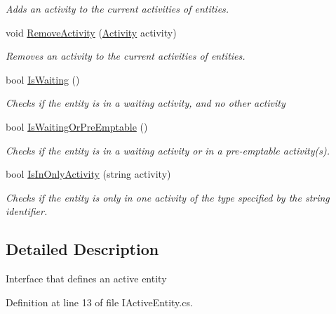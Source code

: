 \begin{DoxyCompactItemize}
\begin{DoxyCompactList}\small\item\em Adds an activity to the current activities of entities. \end{DoxyCompactList}\item 
void \hyperlink{interface_simulation_core_1_1_h_c_c_m_elements_1_1_i_active_entity_a66fe7387a0130d776a02af77973b69e8}{Remove\+Activity} (\hyperlink{class_simulation_core_1_1_h_c_c_m_elements_1_1_activity}{Activity} activity)
\begin{DoxyCompactList}\small\item\em Removes an activity to the current activities of entities. \end{DoxyCompactList}\item 
bool \hyperlink{interface_simulation_core_1_1_h_c_c_m_elements_1_1_i_active_entity_a290d158994bc0c9a1b2bed6969b07a3f}{Is\+Waiting} ()
\begin{DoxyCompactList}\small\item\em Checks if the entity is in a waiting activity, and no other activity \end{DoxyCompactList}\item 
bool \hyperlink{interface_simulation_core_1_1_h_c_c_m_elements_1_1_i_active_entity_a3429416bd86ca81cb6e272ba535aa8ea}{Is\+Waiting\+Or\+Pre\+Emptable} ()
\begin{DoxyCompactList}\small\item\em Checks if the entity is in a waiting activity or in a pre-\/emptable activity(s). \end{DoxyCompactList}\item 
bool \hyperlink{interface_simulation_core_1_1_h_c_c_m_elements_1_1_i_active_entity_a35db5a80f606be24679e88cd9763f8f9}{Is\+In\+Only\+Activity} (string activity)
\begin{DoxyCompactList}\small\item\em Checks if the entity is only in one activity of the type specified by the string identifier. \end{DoxyCompactList}\end{DoxyCompactItemize}


\subsection{Detailed Description}
Interface that defines an active entity 



Definition at line 13 of file I\+Active\+Entity.\+cs.



